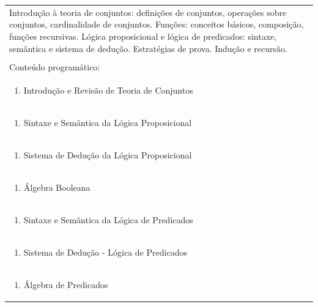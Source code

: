 \documentclass[11pt]{article}
\begin{document}
\begin{center}
\begin{longtable}{|p{4cm}|p{4cm}|p{4cm}|p{4cm}|}
\multicolumn{4}{|p{\dimexpr 16cm + 6\tabcolsep\relax}|}{Introdução à teoria de conjuntos: definições de conjuntos, operações sobre conjuntos, cardinalidade de conjuntos. Funções: conceitos básicos, composição, funções recursivas. Lógica proposicional e lógica de predicados: sintaxe, semântica e sistema de dedução. Estratégias de prova. Indução e recursão.}\\
\multicolumn{4}{|p{16cm}|}{}\\
\hline
\multicolumn{4}{|p{16cm}|}{Conteúdo programático:}\\*
\multicolumn{4}{|p{\dimexpr 16cm + 6\tabcolsep\relax}|}{\begin{enumerate}[start=1]\item Introdução e Revisão de Teoria de Conjuntos\end{enumerate}}\\
\multicolumn{4}{|p{\dimexpr 16cm + 6\tabcolsep\relax}|}{\begin{enumerate}[start=2]\item Sintaxe e Semântica da Lógica Proposicional\end{enumerate}}\\
\multicolumn{4}{|p{\dimexpr 16cm + 6\tabcolsep\relax}|}{\begin{enumerate}[start=3]\item Sistema de Dedução da Lógica Proposicional\end{enumerate}}\\
\multicolumn{4}{|p{\dimexpr 16cm + 6\tabcolsep\relax}|}{\begin{enumerate}[start=4]\item Álgebra Booleana\end{enumerate}}\\
\multicolumn{4}{|p{\dimexpr 16cm + 6\tabcolsep\relax}|}{\begin{enumerate}[start=5]\item Sintaxe e Semântica da Lógica de Predicados\end{enumerate}}\\
\multicolumn{4}{|p{\dimexpr 16cm + 6\tabcolsep\relax}|}{\begin{enumerate}[start=6]\item Sistema de Dedução - Lógica de Predicados\end{enumerate}}\\
\multicolumn{4}{|p{\dimexpr 16cm + 6\tabcolsep\relax}|}{\begin{enumerate}[start=7]\item Álgebra de Predicados\end{enumerate}}\\

\end{longtable}
\end{center}
\end{document}
